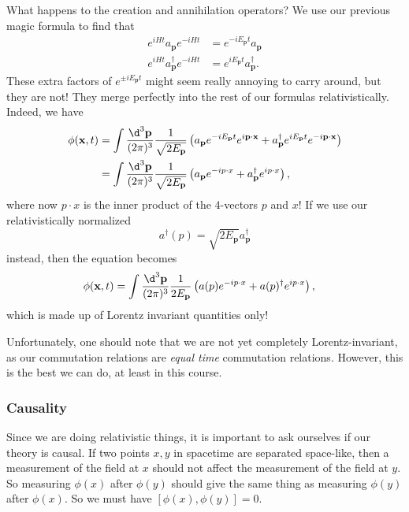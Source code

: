 \documentclass[a4paper]{article}
\begin{document}
What happens to the creation and annihilation operators? We use our previous magic formula to find that
\begin{align*}
  e^{iHt}a_\mathbf{p} e^{-iHt} &= e^{-iE_\mathbf{p} t} a_\mathbf{p}\\
  e^{iHt} a_\mathbf{p}^\dagger e^{-iHt} &= e^{iE_\mathbf{p} t} a_\mathbf{p}^\dagger.
\end{align*}
These extra factors of $e^{\pm iE_\mathbf{p} t}$ might seem really annoying to carry around, but they are not! They merge perfectly into the rest of our formulas relativistically. Indeed, we have
\begin{align*}
  \phi(\mathbf{x}, t) &= \int \frac{\d^3 \mathbf{p}}{(2\pi)^3}\frac{1}{\sqrt{2 E_\mathbf{p}}} \left(a_\mathbf{p}e^{-iE_\mathbf{p} t} e^{i\mathbf{p}\cdot \mathbf{x}} + a_\mathbf{p}^\dagger e^{iE_\mathbf{p} t} e^{-i\mathbf{p}\cdot \mathbf{x}}\right)\\
  &= \int \frac{\d^3 \mathbf{p}}{(2\pi)^3}\frac{1}{\sqrt{2 E_\mathbf{p}}} \left(a_\mathbf{p} e^{-ip \cdot x} + a_\mathbf{p}^\dagger e^{i p \cdot x}\right),
\end{align*}
where now $p \cdot x$ is the inner product of the $4$-vectors $p$ and $x$! If we use our relativistically normalized
\[
  a^\dagger(p) = \sqrt{2 E_\mathbf{p}} a_\mathbf{p}^\dagger
\]
instead, then the equation becomes
\begin{align*}
  \phi(\mathbf{x}, t) &= \int \frac{\d^3 \mathbf{p}}{(2\pi)^3} \frac{1}{2E_\mathbf{p}}\left(a(p) e^{-ip \cdot x} + a(p)^\dagger e^{i p \cdot x}\right),
\end{align*}
which is made up of Lorentz invariant quantities only!

Unfortunately, one should note that we are not yet completely Lorentz-invariant, as our commutation relations are \emph{equal time} commutation relations. However, this is the best we can do, at least in this course.

\subsubsection*{Causality}
Since we are doing relativistic things, it is important to ask ourselves if our theory is causal. If two points $x, y$ in spacetime are separated space-like, then a measurement of the field at $x$ should not affect the measurement of the field at $y$. So measuring $\phi(x)$ after $\phi(y)$ should give the same thing as measuring $\phi(y)$ after $\phi(x)$. So we must have $[\phi(x), \phi(y)] = 0$.
\end{document}

